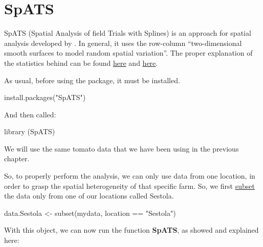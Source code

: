 \documentclass[
]{book}
\newenvironment{Shaded}{\begin{snugshade}}{\end{snugshade}}
\newcommand{\FunctionTok}[1]{\textcolor[rgb]{0.00,0.00,0.00}{#1}}
\newcommand{\NormalTok}[1]{#1}
\newcommand{\OtherTok}[1]{\textcolor[rgb]{0.56,0.35,0.01}{#1}}
\newcommand{\SpecialCharTok}[1]{\textcolor[rgb]{0.00,0.00,0.00}{#1}}
\newcommand{\StringTok}[1]{\textcolor[rgb]{0.31,0.60,0.02}{#1}}
\begin{document}
\hypertarget{spats}{%
\section{SpATS}\label{spats}}

SpATS (Spatial Analysis of field Trials with Splines) is an approach for spatial analysis developed by \citet{spats2017}. In general, it uses the row-column ``two-dimensional
smooth surfaces to model random spatial variation''. The proper explanation of the statistics behind can be found \href{https://www.sciencedirect.com/science/article/pii/S2211675317301070?casa_token=vtmG6I6PWwsAAAAA:UXWSox0zDSMUU3wnJfCEvtBFbTrW4FK1EOdf-GT6O00G1MVMWpMRLNevjzVwRDNf71y46ml6}{here} and \href{https://link.springer.com/article/10.1007/s00122-017-2894-4}{here}.

As usual, before using the package, it must be installed.

\begin{Shaded}
\begin{Highlighting}[]
\FunctionTok{install.packages}\NormalTok{(}\StringTok{"SpATS"}\NormalTok{)}
\end{Highlighting}
\end{Shaded}

And then called:

\begin{Shaded}
\begin{Highlighting}[]
\FunctionTok{library}\NormalTok{ (SpATS)}
\end{Highlighting}
\end{Shaded}

We will use the same tomato data that we have been using in the previous chapter.

So, to properly perform the analysis, we can only use data from one location, in order to grasp the spatial heterogeneity of that specific farm. So, we first \protect\hyperlink{basic-r}{subset} the data only from one of our locations called Sestola.

\begin{Shaded}
\begin{Highlighting}[]
\NormalTok{data.Sestola }\OtherTok{\textless{}{-}} \FunctionTok{subset}\NormalTok{(mydata, location }\SpecialCharTok{==} \StringTok{"Sestola"}\NormalTok{)}
\end{Highlighting}
\end{Shaded}

With this object, we can now run the function \textbf{SpATS}, as showed and explained here:
\end{document}
